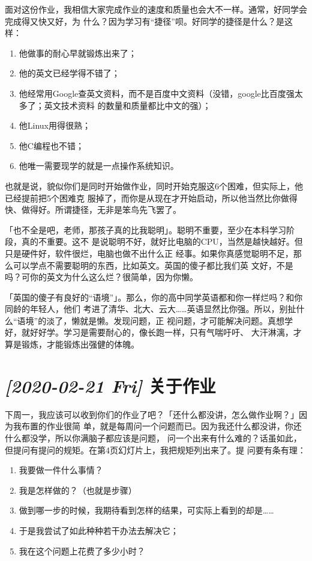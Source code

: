 \documentclass{wx672ctexart} [NO-DEFAULT-PACKAGES] \usepackage{wx672hyperref}
\begin{document}
面对这份作业，我相信大家完成作业的速度和质量也会大不一样。通常，好同学会完成得又快又好，为
什么？因为学习有“捷径”呗。好同学的捷径是什么？是这样：
\begin{enumerate}
\item 他做事的耐心早就锻炼出来了；
\item 他的英文已经学得不错了；
\item 他经常用Google查英文资料，而不是百度中文资料（没错，google比百度强太多了；英文技术资料
的数量和质量都比中文的强）；
\item 他Linux用得很熟；
\item 他C编程也不错；
\item 他唯一需要现学的就是一点操作系统知识。
\end{enumerate}

也就是说，貌似你们是同时开始做作业，同时开始克服这6个困难，但实际上，他已经提前把5个困难克
服掉了，而你是从现在才开始启动，所以他当然比你做得快、做得好。所谓捷径，无非是笨鸟先飞罢了。

「也不全是吧，老师，那孩子真的比我聪明」。聪明不重要，至少在本科学习阶段，真的不重要。这不
是说聪明不好，就好比电脑的CPU，当然是越快越好。但只是硬件好，软件很烂，电脑也做不出什么正
经事。如果你真感觉聪明不足，那么可以学点不需要聪明的东西，比如英文。英国的傻子都比我们英
文好，不是吗？可你的英文为什么这么烂？很简单，因为你懒。

「英国的傻子有良好的“语境”」。那么，你的高中同学英语都和你一样烂吗？和你同龄的年轻人，他们
考进了清华、北大、云大……英语显然比你强。所以，别扯什么“语境”的淡了，懒就是懒。发现问题，正
视问题，才可能解决问题。真想学好，就好好学。学习是需要耐心的，像长跑一样，只有气喘吁吁、
大汗淋漓，才算是锻炼，才能锻炼出强健的体魄。

\section{\textit{[2020-02-21 Fri] } 关于作业}
\label{sec:orgfb40ea9}

下周一，我应该可以收到你们的作业了吧？「还什么都没讲，怎么做作业啊？」因为我布置的作业很简
单，就是每周问一个问题而已。因为我还什么都没讲，你还什么都没学，所以你满脑子都应该是问题，
问一个出来有什么难的？话虽如此，但提问有提问的规矩。在第4页幻灯片上，我把规矩列出来了。提
问要有条有理：
\begin{enumerate}
\item 我要做一件什么事情？
\item 我是怎样做的？（也就是步骤）
\item 做到哪一步的时候，我期待看到怎样的结果，可实际上看到的却是……
\item 于是我尝试了如此种种若干办法去解决它；
\item 我在这个问题上花费了多少小时？
\end{enumerate}
\end{document}

